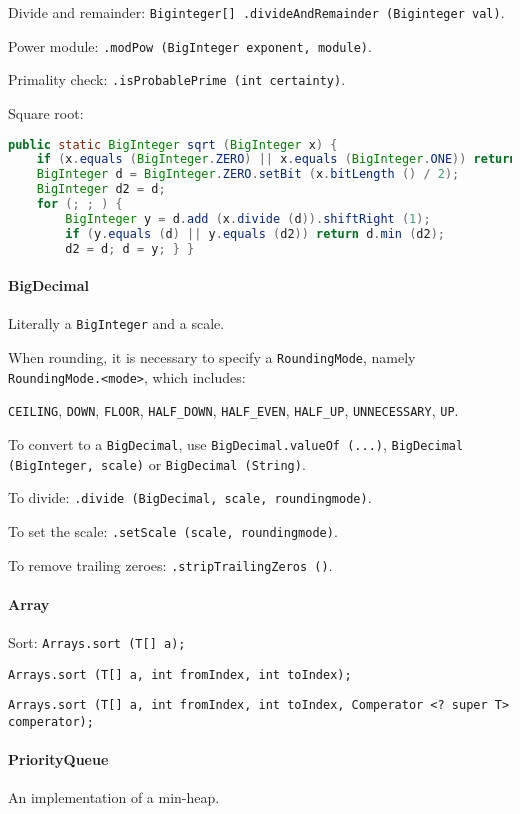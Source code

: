 Divide and remainder: \texttt{Biginteger[] .divideAndRemainder (Biginteger val)}.

Power module: \texttt{.modPow (BigInteger exponent, module)}.

Primality check: \texttt{.isProbablePrime (int certainty)}.

Square root:
\begin{lstlisting}[language=java]
public static BigInteger sqrt (BigInteger x) {
	if (x.equals (BigInteger.ZERO) || x.equals (BigInteger.ONE)) return x;
	BigInteger d = BigInteger.ZERO.setBit (x.bitLength () / 2);
	BigInteger d2 = d;
	for (; ; ) {
		BigInteger y = d.add (x.divide (d)).shiftRight (1);
		if (y.equals (d) || y.equals (d2)) return d.min (d2);
		d2 = d; d = y; } }
\end{lstlisting}

\paragraph{BigDecimal}
Literally a \texttt{BigInteger} and a scale.

When rounding, it is necessary to specify a \texttt{RoundingMode}, namely \texttt{RoundingMode.<mode>}, which includes: 

\texttt{CEILING}, \texttt{DOWN}, \texttt{FLOOR}, \texttt{HALF\_DOWN}, \texttt{HALF\_EVEN}, \texttt{HALF\_UP}, \texttt{UNNECESSARY}, \texttt{UP}.

To convert to a \texttt{BigDecimal}, use \texttt{BigDecimal.valueOf (...)}, \texttt{BigDecimal (BigInteger, scale)} or \texttt{BigDecimal (String)}.

To divide: \texttt{.divide (BigDecimal, scale, roundingmode)}.

To set the scale: \texttt{.setScale (scale, roundingmode)}.

To remove trailing zeroes: \texttt{.stripTrailingZeros ()}.

\paragraph{Array}
Sort: \texttt{Arrays.sort (T[] a);}

\texttt{Arrays.sort (T[] a, int fromIndex, int toIndex);}

\texttt{Arrays.sort (T[] a, int fromIndex, int toIndex, Comperator <? super T> comperator);}

\paragraph{PriorityQueue}
An implementation of a min-heap.

